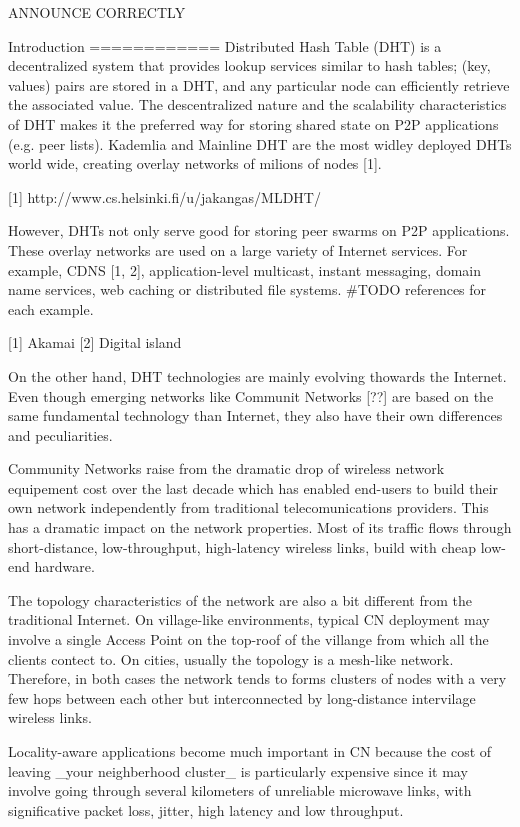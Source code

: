 ANNOUNCE CORRECTLY

Introduction
============
Distributed Hash Table (DHT) is a decentralized system that provides lookup services 
similar to hash tables; (key, values) pairs are stored in a DHT, and any particular 
node can efficiently retrieve the associated value. The descentralized nature and 
the scalability characteristics of DHT makes it the preferred way for storing shared 
state on P2P applications (e.g. peer lists). Kademlia and Mainline DHT are the most 
widley deployed DHTs world wide, creating overlay networks of milions of nodes [1].

[1] http://www.cs.helsinki.fi/u/jakangas/MLDHT/

However, DHTs not only serve good for storing peer swarms on P2P applications. These overlay 
networks are used on a large variety of Internet services. For example, CDNS [1, 2], 
application-level multicast, instant messaging, domain name services, web caching 
or distributed file systems. #TODO references for each example.

[1] Akamai
[2] Digital island

On the other hand, DHT technologies are mainly evolving thowards the Internet. 
Even though emerging networks like Communit Networks [??] are based on the same 
fundamental technology than Internet, they also have their own differences and peculiarities.

Community Networks raise from the dramatic drop of wireless network equipement 
cost over the last decade which has enabled end-users to build their own network 
independently from traditional telecomunications providers. This has a dramatic 
impact on the network properties. Most of its traffic flows through short-distance, 
low-throughput, high-latency wireless links, build with cheap low-end hardware.

The topology characteristics of the network are also a bit different from the traditional Internet. 
On village-like environments, typical CN deployment may involve a single Access Point 
on the top-roof of the villange from which all the clients contect to. On cities, 
usually the topology is a mesh-like network. Therefore, in both cases the network 
tends to forms clusters of nodes with a very few hops between each other but interconnected 
by long-distance intervilage wireless links.

Locality-aware applications become much important in CN because the cost of leaving 
_your neighberhood cluster_ is particularly expensive since it may involve going 
through several kilometers of unreliable microwave links, with significative packet loss, 
jitter, high latency and low throughput.

